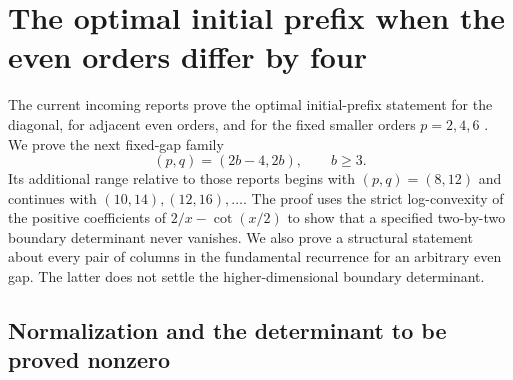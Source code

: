 \documentclass[11pt]{article}
\theoremstyle{definition}
\theoremstyle{remark}
\numberwithin{equation}{section}
\begin{document}
\section{The optimal initial prefix when the even orders differ by four}
\label{eg:section}

The current incoming reports prove the optimal initial-prefix statement
for the diagonal, for adjacent even orders, and for the fixed smaller
orders $p=2,4,6$ \cite{Canonical,Differential,Bernoulli,Polygamma}.
We prove the next fixed-gap family
\[
                    (p,q)=(2b-4,2b),\qquad b\ge3.
\]
Its additional range relative to those reports begins with $(p,q)=(8,12)$ and continues
with $(10,14),(12,16),\ldots$. The proof uses the strict log-convexity
of the positive coefficients of $2/x-\cot(x/2)$ to show that a
specified two-by-two boundary determinant never vanishes. We also
prove a structural statement about every pair of columns in the
fundamental recurrence for an arbitrary even gap. The latter does
not settle the higher-dimensional boundary determinant.

\subsection{Normalization and the determinant to be proved nonzero}
\end{document}
